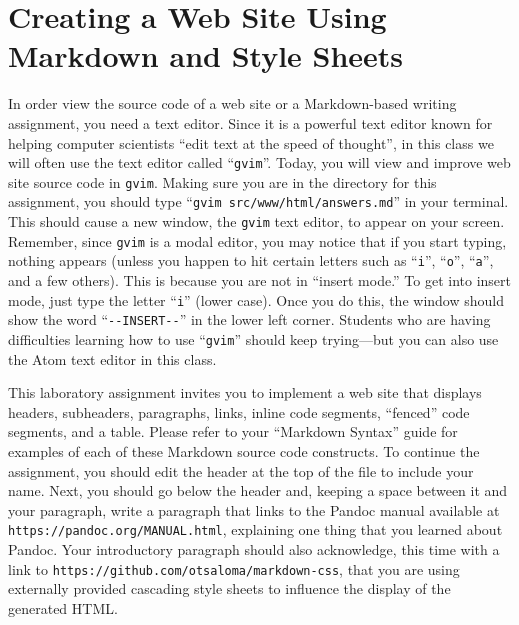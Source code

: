 \documentclass[11pt]{article}
\newcommand{\command}[1]{``\lstinline{#1}''}
\newcommand{\program}[1]{\lstinline{#1}}
\newcommand{\url}[1]{\lstinline{#1}}
\begin{document}
\section*{Creating a Web Site Using Markdown and Style Sheets}

In order view the source code of a web site or a Markdown-based writing
assignment, you need a text editor. Since it is a powerful text editor known for
helping computer scientists ``edit text at the speed of thought'', in this class
we will often use the text editor called \command{gvim}. Today, you will view
and improve web site source code in {\tt gvim}. Making sure you are in the
directory for this assignment, you should type \command{gvim
src/www/html/answers.md} in your terminal. This should cause a new window, the
\program{gvim} text editor, to appear on your screen. Remember, since
\program{gvim} is a modal editor, you may notice that if you start typing,
nothing appears (unless you happen to hit certain letters such as \command{i},
\command{o}, \command{a}, and a few others). This is because you are not in
``insert mode.'' To get into insert mode, just type the letter \command{i}
(lower case). Once you do this, the window should show the word
\command{--INSERT--} in the lower left corner. Students who are having
difficulties learning how to use \command{gvim} should keep trying---but you can
also use the Atom text editor in this class.

This laboratory assignment invites you to implement a web site that displays
headers, subheaders, paragraphs, links, inline code segments, ``fenced'' code
segments, and a table. Please refer to your ``Markdown Syntax'' guide for
examples of each of these Markdown source code constructs. To continue the
assignment, you should edit the header at the top of the file to include your
name. Next, you should go below the header and, keeping a space between it and
your paragraph, write a paragraph that links to the Pandoc manual available at
\url{https://pandoc.org/MANUAL.html}, explaining one thing that you learned
about Pandoc. Your introductory paragraph should also acknowledge, this time
with a link to \url{https://github.com/otsaloma/markdown-css}, that you are
using externally provided cascading style sheets to influence the display of the
generated HTML.
\end{document}
